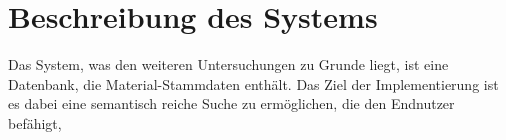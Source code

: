 \section{Beschreibung des Systems}
Das System, was den weiteren Untersuchungen zu Grunde liegt, ist eine Datenbank, die Material-Stammdaten enthält. Das Ziel der Implementierung ist es dabei eine semantisch reiche Suche zu ermöglichen, die den Endnutzer befähigt, 